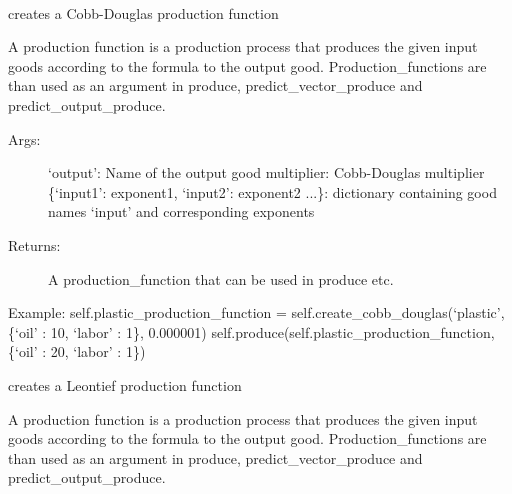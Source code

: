 \documentclass[letterpaper,10pt,english]{sphinxmanual}
\begin{document}
\begin{fulllineitems}
\label{FirmMultiTechnologies:abce.FirmMultiTechnologies}~

\begin{fulllineitems}
\label{FirmMultiTechnologies:abce.FirmMultiTechnologies.create_cobb_douglas}
creates a Cobb-Douglas production function

A production function is a production process that produces the
given input  goods according to the formula to the output
good.
Production\_functions are than used as an argument in produce,
predict\_vector\_produce and predict\_output\_produce.
\begin{description}
\item[{Args:}] \leavevmode
`output': Name of the output good
multiplier: Cobb-Douglas multiplier
\{`input1': exponent1, `input2': exponent2 ...\}: dictionary
containing good names `input' and corresponding exponents

\item[{Returns:}] \leavevmode
A production\_function that can be used in produce etc.

\end{description}

Example:
self.plastic\_production\_function = self.create\_cobb\_douglas(`plastic', \{`oil' : 10, `labor' : 1\}, 0.000001)
self.produce(self.plastic\_production\_function, \{`oil' : 20, `labor' : 1\})

\end{fulllineitems}


\begin{fulllineitems}
\label{FirmMultiTechnologies:abce.FirmMultiTechnologies.create_leontief}
creates a Leontief production function

A production function is a production process that produces the
given input  goods according to the formula to the output
good.
Production\_functions are than used as an argument in produce,
predict\_vector\_produce and predict\_output\_produce.


\end{fulllineitems}
\end{fulllineitems}
\end{document}
